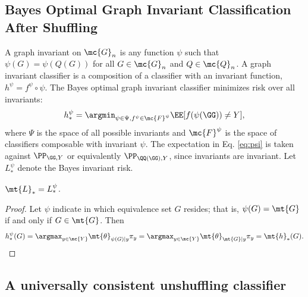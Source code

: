 \documentclass[10pt,journal,cspaper,compsoc]{IEEEtran}
\newcommand{\Qs}{Q}
\begin{document}
\subsection{Bayes Optimal Graph Invariant Classification After Shuffling} %
\label{sec:gi}

A graph invariant on $\mc{G}_n$ is any function $\psi$  such that $\psi(G)=\psi(\Qs(G))$ for all $G \in \mc{G}_n$ and $\Qs \in \mc{Q}_n$.  A graph invariant classifier is a composition of a classifier with an invariant function, $h^\psi=f^\psi \circ \psi$.  The Bayes optimal graph invariant classifier minimizes risk over all invariants: 
\begin{align} \label{eq:psi}
	h_*^{\psi}=\argmin_{\psi \in \Psi, f^{\psi} \in \mc{F}^{\psi}} \EE[f(\psi(\GG))\neq Y],
\end{align}
where $\Psi$ is the space of all possible invariants and $\mc{F}^{\psi}$ is the space of classifiers composable with invariant $\psi$. The expectation in Eq. \eqref{eq:psi} is taken against $\PP_{\GG,Y}$ or equivalently $\PP_{\QQ(\GG),Y}$, since invariants are invariant.
  Let $L_*^{\psi}$ denote the Bayes invariant risk.  
\begin{thm} \label{thm:3}
	$\mt{L}_*=L_*^\psi$.
\end{thm}

\begin{proof}
Let $\psi$ indicate in which equivalence set $G$ resides; that is,  $\psi(G)=\mt{G}$ if and only if $G \in \mt{G}$.  Then
\begin{align}
	h^{\psi}_*(G)= \argmax_{y \in \mc{Y}} \mt{\theta}_{\psi(G)|y} \pi_y = \argmax_{y \in \mc{Y}} \mt{\theta}_{\mt{G}|y} \pi_y = \mt{h}_*(G).
\end{align}
\end{proof}



\subsection{A universally consistent unshuffling classifier} %
\label{sec:bayes_optimal_graph_invariant_based_classifier}
\end{document}
